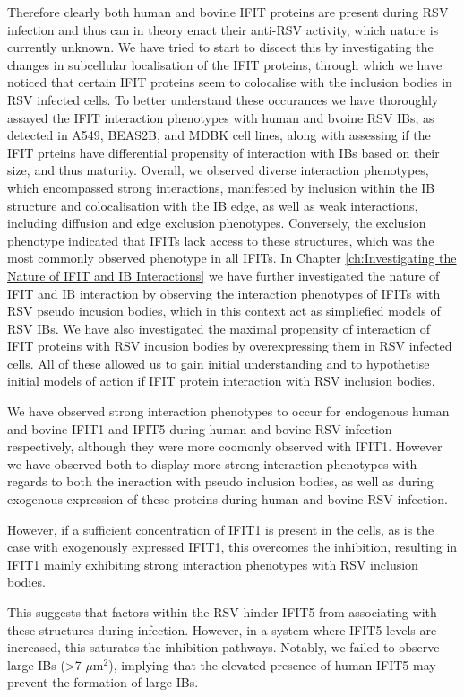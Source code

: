 Therefore clearly both human and bovine IFIT proteins are present during RSV infection and thus can in theory enact their anti-RSV activity, which nature is currently unknown. We have tried to start to discect this by investigating the changes in subcellular localisation of the IFIT proteins, through which we have noticed that certain IFIT proteins seem to colocalise with the inclusion bodies in RSV infected cells. To better understand these occurances we have thoroughly assayed the IFIT interaction phenotypes with human and bvoine RSV IBs, as detected in A549, BEAS2B, and MDBK cell lines, along with assessing if the IFIT prteins have differential propensity of interaction with IBs based on their size, and thus maturity. Overall, we observed diverse interaction phenotypes, which encompassed strong interactions, manifested by inclusion within the IB structure and colocalisation with the IB edge, as well as weak interactions, including diffusion and edge exclusion phenotypes. Conversely, the exclusion phenotype indicated that IFITs lack access to these structures, which was the most commonly observed phenotype in all IFITs. In Chapter \ref{ch:Investigating the Nature of IFIT and IB Interactions} we have further investigated the nature of IFIT and IB interaction by observing the interaction phenotypes of IFITs with RSV pseudo incusion bodies, which in this context act as simpliefied models of RSV IBs. We have also investigated the maximal propensity of interaction of IFIT proteins with RSV incusion bodies by overexpressing them in RSV infected cells. All of these allowed us to gain initial understanding and to hypothetise initial models of action if IFIT protein interaction with RSV inclusion bodies. 

We have observed strong interaction phenotypes to occur for endogenous human and bovine IFIT1 and IFIT5 during human and bovine RSV infection respectively, although they were more coomonly observed with IFIT1. However we have observed both to display more strong interaction phenotypes with regards to both the ineraction with pseudo inclusion bodies, as well as during exogenous expression of these proteins during human and bovine RSV infection.




However, if a sufficient concentration of IFIT1 is present in the cells, as is the case with exogenously expressed IFIT1, this overcomes the inhibition, resulting in IFIT1 mainly exhibiting strong interaction phenotypes with RSV inclusion bodies.

This suggests that factors within the RSV hinder IFIT5 from associating with these structures during infection. However, in a system where IFIT5 levels are increased, this saturates the inhibition pathways. Notably, we failed to observe large IBs (>7 \(\mu \mbox{m}^2\)), implying that the elevated presence of human IFIT5 may prevent the formation of large IBs.

